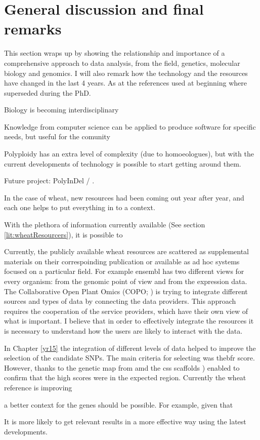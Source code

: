 
\chapter{General discussion and final remarks}
This section wraps up by showing the relationship and importance of a comprehensive approach to data analysis, from the field, genetics, molecular biology and genomics. I will also remark how the technology and the resources have changed in the last 4 years. As at the references used at beginning where superseded during the PhD. 


Biology is becoming interdisciplinary

Knowledge from  computer science can be applied to produce software for specific needs, but useful for the comunity

Polyploidy has an extra level of complexity (due to homoeologues), but with the current developments of technology is possible to start getting around them. 

Future project: PolyInDel / . 

In the case of wheat, new resources had been coming out year after year, and each one helps to put everything in to a context. 

With the plethora of information currently available (See section \ref{lit:wheatResourcers}), it is possible to 

Currently, the publicly available wheat resources are scattered as supplemental materials on their correspoinding publication or available as ad hoc systems focused on a particular field.
For example ensembl has two different views for every organism: from the genomic point of view and from the expression data. 
The Collaborative Open Plant Omics (COPO; \citealt{Davey2015}) is trying to integrate different sources and types of data by connecting the data providers. 
This approach requires the cooperation of the service providers, which have their own view of what is important. 
I believe that in order to effectively integrate the resources it is necessary to understand how the users are likely to interact with the data. 

In Chapter \ref{yr15} the integration of different levels of data helped to improve the selection of the candidate SNPs. 
The main criteria for selecting   was the\acrshort{bfr} score.
However, thanks to the genetic map from \citet{Wang2014}amd the \acrshort{css} scaffolds \citep{Mayer2014}) enabled to confirm that the high scores were in the expected region. 
Currently the wheat reference is improving 

 a better context for the genes should be possible. 
For example, given that


It is more likely to get relevant results in a more effective way using the latest developments. 

